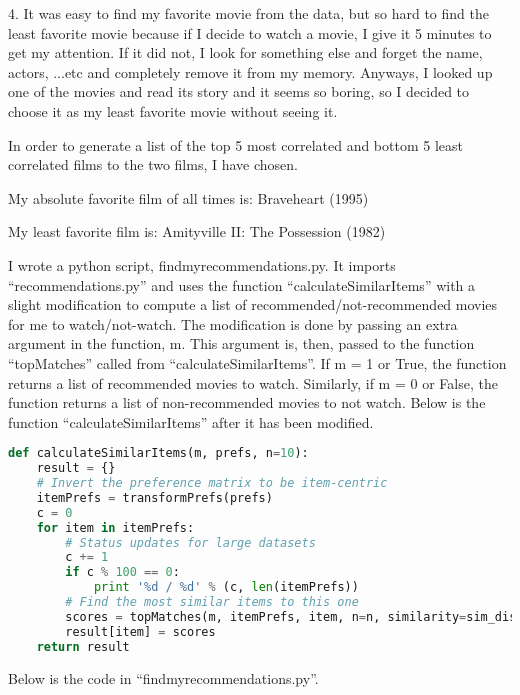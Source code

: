 \documentclass[a4paper, 11pt]{article}
\begin{document}
4. It was easy to find my favorite movie from the data, but so hard to find the least favorite movie because if I decide to watch a movie, I give it 5 minutes to get my attention. If it did not, I look for something else and forget the name, actors, ...etc and completely remove it from my memory. Anyways, I looked up one of the movies and read its story and it seems so boring, so I decided to choose it as my least favorite movie without seeing it. 

In order to generate a list of the top 5 most correlated and bottom 5 least correlated films to the two films, I have chosen.

My absolute favorite film of all times is: Braveheart (1995)

My least favorite film is: Amityville II: The Possession (1982)

I wrote a python script, findmyrecommendations.py. It imports ``recommendations.py'' and uses the function ``calculateSimilarItems'' with a slight modification to compute a list of recommended/not-recommended movies for me to watch/not-watch. The modification is done by passing an extra argument in the function, m. This argument is, then, passed to the function ``topMatches'' called from ``calculateSimilarItems''. If m = 1 or True, the function returns a list of recommended movies to watch. Similarly, if m = 0 or False, the function returns a list of non-recommended movies to not watch. Below is the function ``calculateSimilarItems'' after it has been modified.

\begin{lstlisting}[language=python, breakatwhitespace=〈false), label=topMatches, caption=topMatches]
def calculateSimilarItems(m, prefs, n=10):
    result = {}
    # Invert the preference matrix to be item-centric
    itemPrefs = transformPrefs(prefs)
    c = 0
    for item in itemPrefs:
        # Status updates for large datasets
        c += 1
        if c % 100 == 0:
            print '%d / %d' % (c, len(itemPrefs))
        # Find the most similar items to this one
        scores = topMatches(m, itemPrefs, item, n=n, similarity=sim_distance)
        result[item] = scores
    return result
\end{lstlisting}

Below is the code in ``findmyrecommendations.py''.


\end{document}
